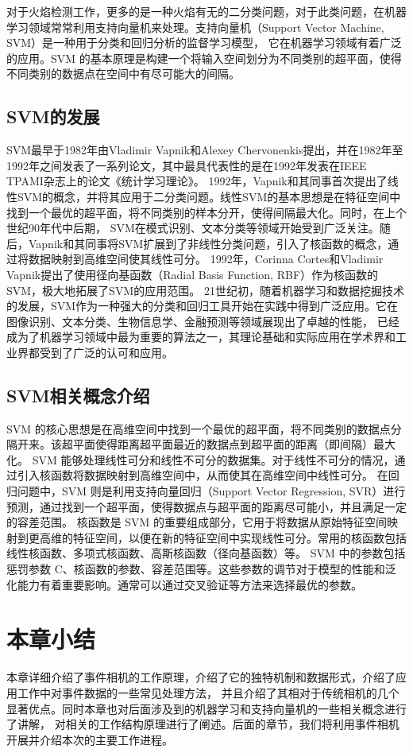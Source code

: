 对于火焰检测工作，更多的是一种火焰有无的二分类问题，对于此类问题，在机器学习领域常常利用支持向量机来处理。支持向量机（Support Vector Machine, SVM）是一种用于分类和回归分析的监督学习模型，
它在机器学习领域有着广泛的应用。SVM 的基本原理是构建一个将输入空间划分为不同类别的超平面，使得不同类别的数据点在空间中有尽可能大的间隔。
\subsection{SVM的发展}
SVM最早于1982年由Vladimir Vapnik和Alexey Chervonenkis提出\cite{stitson1996theory}，并在1982年至1992年之间发表了一系列论文，其中最具代表性的是在1992年发表在IEEE TPAMI杂志上的论文《统计学习理论》。
1992年，Vapnik和其同事首次提出了线性SVM的概念，并将其应用于二分类问题\cite{chapelle1999support}。线性SVM的基本思想是在特征空间中找到一个最优的超平面，将不同类别的样本分开，使得间隔最大化。同时，在上个世纪90年代中后期，
SVM在模式识别、文本分类等领域开始受到广泛关注。随后，Vapnik和其同事将SVM扩展到了非线性分类问题，引入了核函数的概念，\cite{cortes1995support}通过将数据映射到高维空间使其线性可分。
1992年，Corinna Cortes和Vladimir Vapnik提出了使用径向基函数（Radial Basis Function, RBF）作为核函数的SVM，极大地拓展了SVM的应用范围。
21世纪初，随着机器学习和数据挖掘技术的发展，SVM作为一种强大的分类和回归工具开始在实践中得到广泛应用。它在图像识别、文本分类、生物信息学、金融预测等领域展现出了卓越的性能，
已经成为了机器学习领域中最为重要的算法之一，其理论基础和实际应用在学术界和工业界都受到了广泛的认可和应用。
\subsection{SVM相关概念介绍}
SVM 的核心思想是在高维空间中找到一个最优的超平面，将不同类别的数据点分隔开来。该超平面使得距离超平面最近的数据点到超平面的距离（即间隔）最大化。
SVM 能够处理线性可分和线性不可分的数据集。对于线性不可分的情况，通过引入核函数将数据映射到高维空间中，从而使其在高维空间中线性可分。
在回归问题中，SVM 则是利用支持向量回归（Support Vector Regression, SVR）进行预测，通过找到一个超平面，使得数据点与超平面的距离尽可能小，并且满足一定的容差范围。
核函数是 SVM 的重要组成部分，它用于将数据从原始特征空间映射到更高维的特征空间，以便在新的特征空间中实现线性可分。常用的核函数包括线性核函数、多项式核函数、高斯核函数（径向基函数）等。
SVM 中的参数包括惩罚参数 C、核函数的参数、容差范围等。这些参数的调节对于模型的性能和泛化能力有着重要影响。通常可以通过交叉验证等方法来选择最优的参数。






\section{本章小结}
本章详细介绍了事件相机的工作原理，介绍了它的独特机制和数据形式，介绍了应用工作中对事件数据的一些常见处理方法，
并且介绍了其相对于传统相机的几个显著优点。同时本章也对后面涉及到的机器学习和支持向量机的一些相关概念进行了讲解，
对相关的工作结构原理进行了阐述。后面的章节，我们将利用事件相机开展并介绍本次的主要工作进程。